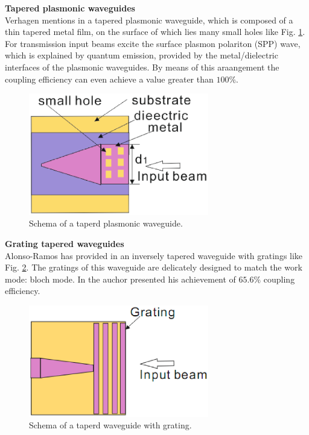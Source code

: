 \textbf{Tapered plasmonic waveguides}\\
Verhagen mentions in \cite{tapered_plasmonic_waveguides} a tapered plasmonic waveguide, which is composed of a thin tapered metal film, on the surface of which lies many small holes like Fig. \ref{fig:tapered_waveguide_plasmonic}. For transmission input beams excite the surface plasmon polariton (SPP) wave, which is explained by quantum emission, provided by the metal/dielectric interfaces of the plasmonic waveguides. By means of this araangement the coupling efficiency can even achieve a value greater than $100\%$. 

\begin{figure}[!ht]
\centering
\includegraphics[width=0.7\textwidth]{bilder/tapered_waveguide_plasmonic}
\caption{Schema of a taperd plasmonic waveguide.}
\label{fig:tapered_waveguide_plasmonic}
\end{figure}

\textbf{Grating tapered waveguides}\\
Alonso-Ramos has provided in \cite{fiber_to_chip_grating_waveguides} an inversely tapered waveguide with gratings like Fig. \ref{fig:tapered_waveguide_grating}. The gratings of this waveguide are  delicately designed to match the work mode: bloch mode. In \cite{fiber_to_chip_grating_waveguides} the auchor presented his achievement of $65.6\%$ coupling efficiency.  
\begin{figure}[!ht]
\centering
\includegraphics[width=0.7\textwidth]{bilder/tapered_waveguide_grating}
\caption{Schema of a taperd waveguide with grating.}
\label{fig:tapered_waveguide_grating}
\end{figure}
